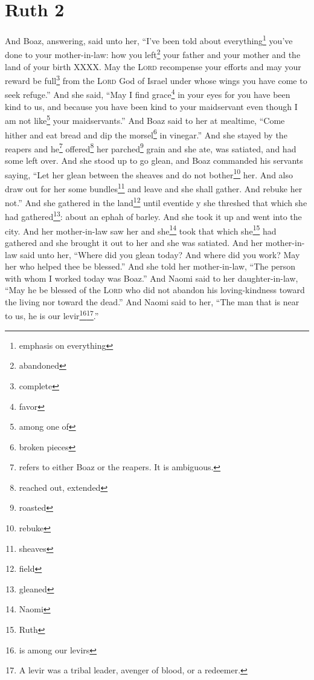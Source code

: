 \section{Ruth 2}\label{Ruth 2}
\begin{enumerate}[align=center]
     And Boaz, answering, said unto her, ``I've been told about everything\footnote{emphasis on everything} you've done to your mother-in-law: how you left\footnote{abandoned} your father and your mother and the land of your birth XXXX.%
     May the \textsc{Lord} recompense your efforts and may your reward be full\footnote{complete} from the \textsc{Lord} God of Israel under whose wings you have come to seek refuge.''%
     And she said, ``May I find grace\footnote{favor} in your eyes for you have been kind to us, and because you have been kind to your maidservant even though I am not like\footnote{among one of} your maidservants.''%
     And Boaz said to her at mealtime, ``Come hither and eat bread and dip the morsel\footnote{broken pieces} in vinegar.'' And she stayed by the reapers and he\footnote{refers to either Boaz or the reapers. It is ambiguous.} offered\footnote{reached out, extended} her parched\footnote{roasted} grain and she ate, was satiated, and had some left over.%
     And she stood up to go glean, and Boaz commanded his servants saying, ``Let her glean between the sheaves and do not bother\footnote{rebuke} her.%
     And also draw out for her some bundles\footnote{sheaves} and leave and she shall gather. And rebuke her not.''%
     And she gathered in the land\footnote{field} until eventide y she threshed that which she had gathered\footnote{gleaned}: about an ephah of barley.%
     And she took it up and went into the city. And her mother-in-law saw her and she\footnote{Naomi} took that which she\footnote{Ruth} had gathered and she brought it out to her and she was satiated.%
     And her mother-in-law said unto her, ``Where did you glean today? And where did you work? May her who helped thee be blessed.'' And she told her mother-in-law, ``The person with whom I worked today was Boaz.''%
     And Naomi said to her daughter-in-law, ``May he be blessed of the \textsc{Lord} who did not abandon his loving-kindness toward the living nor toward the dead.'' And Naomi said to her, ``The man that is near to us, he is our levir\footnote{is among our levirs}\footnote{A levir was a tribal leader, avenger of blood, or a redeemer.}.''%

\end{enumerate}
